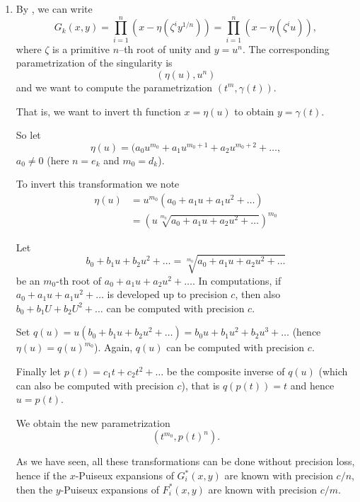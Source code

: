 \documentclass[a4paper,11pt,reqno]{amsart}%
\theoremstyle{definition}
\theoremstyle{plain}
\theoremstyle{remark}
\begin{document}
\begin{enumerate}
We have to show that if we apply this same reparametrization to $G_k$ we will obtain
$$G_k(\alpha(X,Y), \beta(X,Y)) \equiv H_k \equiv F_k \mod X^{N_0 - \kappa}.$$

\item By \cite[Theorem 5.17]{JP}, we can write
$$
G_k(x,y) = \prod_{i=1}^n (x - \eta(\zeta^i y^{1/n})) = \prod_{i=1}^n (x - \eta(\zeta^i u)),
$$
where $\zeta$ is a primitive $n$–th root of unity and $y = u^n$. The corresponding parametrization of the singularity is
$$
(\eta(u), u^n)
$$
and we want to compute the parametrization $(t^m, \gamma(t))$.

That is, we want to invert th function $x = \eta(u)$ to obtain $y = \gamma(t)$.

So let
$$\eta(u) = (a_0 u^{m_0} + a_1 u^{m_0+1} + a_2 u^{m_0+2} + \dots,$$
$a_0 \neq 0$ (here $n = e_k$ and $m_0 = d_k$).

To invert this transformation we note
\begin{align*}
\eta(u) &= u^{m_0} (a_0 + a_1 u + a_1 u^2 + \dots) \\
        &= \left(u \sqrt[m_0]{a_0 + a_1 u + a_2 u^2 + \dots}\right)^{m_0}
\end{align*}

Let
$$
b_0 + b_1 u + b_2 u^2 + \dots = \sqrt[m_0]{a_0 + a_1 u + a_2 u^2 + \dots}
$$
be an $m_0$-th root of $a_0 + a_1 u + a_2 u^2 + \dots$. In computations, if $a_0 + a_1 u + a_1 u^2 + \dots$ is developed up to precision $c$, then also $b_0 + b_1 U + b_2 U^2 + \dots$ can be computed with precision $c$.

Set $q(u) = u (b_0  + b_1 u + b_2 u^2 + \dots) = b_0 u + b_1 u^2 + b_2 u^3 + \dots$ (hence $\eta(u) = q(u)^{m_0}$). Again, $q(u)$ can be computed with precision $c$.

Finally let $p(t) = c_1 t + c_2 t^2 + \dots$ be the composite inverse of $q(u)$ (which can also be computed with precision $c$), that is $q(p(t)) = t$ and hence $u = p(t)$.

We obtain the new parametrization
$$(t^{m_0}, p(t)^n).$$

As we have seen, all these transformations can be done without precision loss, hence if the $x$-Puiseux expansions of $G^*_i(x,y)$ are known with precision $c/n$, then the $y$-Puiseux expansions of $F^*_i(x,y)$ are known with precision $c/m$.
%

\end{enumerate}
\end{document}
